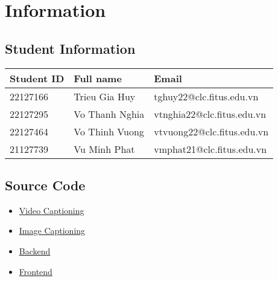 \section{Information}
\subsection{Student Information}
\renewcommand{\arraystretch}{2}

\begin{center}
\begin{tabular}{|>{\centering\arraybackslash}m{4cm}|>{\centering\arraybackslash}m{5cm}|>{\centering\arraybackslash}m{7cm}|}
  \hline
  \textbf{\Large Student ID} & \textbf{\Large Full name} & \textbf{\Large Email} \\
  \hline
  \Large 22127166 & \Large Trieu Gia Huy & \Large tghuy22@clc.fitus.edu.vn
  \\
  \hline
  \Large 22127295 & \Large Vo Thanh Nghia & \Large vtnghia22@clc.fitus.edu.vn \\
  \hline
  \Large 22127464 & \Large Vo Thinh Vuong & \Large vtvuong22@clc.fitus.edu.vn \\
  \hline  
  \Large 21127739 & \Large Vu Minh Phat & \Large vmphat21@clc.fitus.edu.vn \\
  \hline    
\end{tabular}
\end{center}

\subsection{Source Code}

\begin{itemize}
  \item \href{https://github.com/nghessss/CSC15004-StatisticalML}{Video Captioning}
  \item \href{https://www.kaggle.com/code/huyg1108/vie-image-captioning}{Image Captioning}
  \item \href{https://www.kaggle.com/code/thanhnghia123/backend}{Backend}
  \item \href{https://github.com/VoThinhVuong/CapVid}{Frontend}
\end{itemize}

